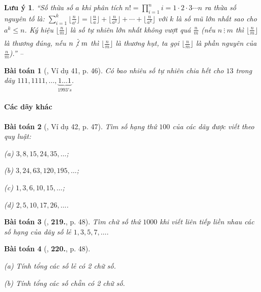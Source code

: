 \documentclass{article}
\numberwithin{equation}{section}
\newtheorem{baitoan}{Bài toán}[section]
\newtheorem{luuy}{Lưu ý}[section]
\begin{document}
\begin{luuy}
	``Số thừa số $a$ khi phân tích $n! = \prod_{i=1}^n i = 1\cdot 2\cdot 3\cdots n$ ra thừa số nguyên tố là: $\sum_{i=1}^k \lfloor\frac{n}{a^i}\rfloor = \lfloor\frac{n}{a}\rfloor + \lfloor\frac{n}{a^2}\rfloor + \cdots + \lfloor\frac{n}{a^k}\rfloor$ với $k$ là số mũ lớn nhất sao cho $a^k\le n$. Ký hiệu $\lfloor\frac{n}{m}\rfloor$ là số tự nhiên lớn nhất không vượt quá $\frac{n}{m}$ (nếu $n\ \vdots\ m$ thì $\lfloor\frac{n}{m}\rfloor$ là thương đúng, nếu $n\not\vdots\ m$ thì $\lfloor\frac{n}{m}\rfloor$ là thương hụt, ta gọi $\lfloor\frac{n}{m}\rfloor$ là \emph{phần nguyên} của $\frac{n}{m}$).'' -- \cite[p. 46]{Binh_Toan_6_tap_1}
\end{luuy}

\begin{baitoan}[\cite{Binh_Toan_6_tap_1}, Ví dụ 41, p. 46]
	Có bao nhiêu số tự nhiên chia hết cho $13$ trong dãy $111,1111,\ldots,\underbrace{1\ldots 1}_{1993's}$.
\end{baitoan}

\paragraph{Các dãy khác}

\begin{baitoan}[\cite{Binh_Toan_6_tap_1}, Ví dụ 42, p. 47]
	Tìm số hạng thứ $100$ của các dãy được viết theo quy luật:
	\begin{enumerate*}
		\item[(a)] $3,8,15,24,35,\ldots$;
		\item[(b)] $3,24,63,120,195,\ldots$;
		\item[(c)] $1,3,6,10,15,\ldots$;
		\item[(d)] $2,5,10,17,26,\ldots$.
	\end{enumerate*}
\end{baitoan}

\begin{baitoan}[\cite{Binh_Toan_6_tap_1}, \textbf{219.}, p. 48]
	Tìm chữ số thứ $1000$ khi viết liên tiếp liền nhau các số hạng của dãy số lẻ $1,3,5,7,\ldots$.
\end{baitoan}

\begin{baitoan}[\cite{Binh_Toan_6_tap_1}, \textbf{220.}, p. 48]
	\begin{enumerate*}
		\item[(a)] Tính tổng các số lẻ có 2 chữ số.
		\item[(b)] Tính tổng các số chẵn có 2 chữ số.
	\end{enumerate*}
\end{baitoan}
\end{document}
